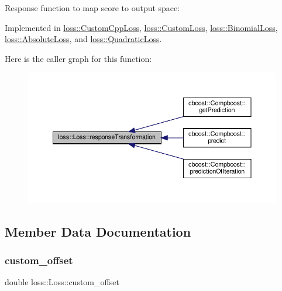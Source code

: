 Response function to map score to output space\+: 



Implemented in \mbox{\hyperlink{classloss_1_1_custom_cpp_loss_a8ef296a7db08423f68dd389824b5aa77}{loss\+::\+Custom\+Cpp\+Loss}}, \mbox{\hyperlink{classloss_1_1_custom_loss_a0db8657c96f53b08aedaddc2fdac973b}{loss\+::\+Custom\+Loss}}, \mbox{\hyperlink{classloss_1_1_binomial_loss_a6fb5f28518ac455cb192441660e7b997}{loss\+::\+Binomial\+Loss}}, \mbox{\hyperlink{classloss_1_1_absolute_loss_aa7e0ac902d905ae97f9e2d0337c6c058}{loss\+::\+Absolute\+Loss}}, and \mbox{\hyperlink{classloss_1_1_quadratic_loss_a0a7f1ed4a208326bed1ba5f1bb4d37e5}{loss\+::\+Quadratic\+Loss}}.

Here is the caller graph for this function\+:\nopagebreak
\begin{figure}[H]
\begin{center}
\leavevmode
\includegraphics[width=350pt]{classloss_1_1_loss_a0a84b7df79b08e40b538aaa7e6ee75c4_icgraph}
\end{center}
\end{figure}


\subsection{Member Data Documentation}
\mbox{\label{classloss_1_1_loss_ae5dc373f54ed65ee0ca54a921ef826f4}} 
\subsubsection{\texorpdfstring{custom\+\_\+offset}{custom\_offset}}
{\footnotesize\ttfamily double loss\+::\+Loss\+::custom\+\_\+offset\hspace{0.3cm}{\ttfamily [protected]}}



